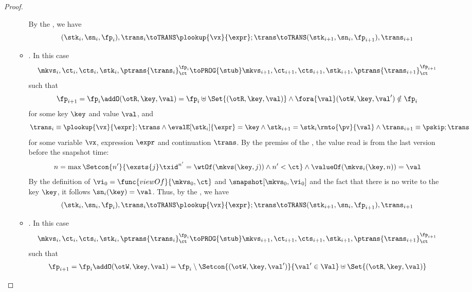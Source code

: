 \begin{proof}
\begin{itemize}
\begin{itemize}
                By the , we have 
                \[
                    (\stk_i, \sn_i, \fp_i), \trans_i \toTRANS \plookup{\vx}{\expr} ; \trans 
                    \toTRANS (\stk_{i+1}, \sn_i, \fp_{i+1} ), \trans_{i+1}
                \]
            \item {}.
                In this case
                \[
                    \mkvs_i, \ct_i, \cts_i, \stk_i, \ptrans{\trans_i}_\ct^{\fp_i}
                    \toPROG{\stub}
                    \mkvs_{i+1}, \ct_{i+1}, \cts_{i+1}, \stk_{i+1}, \ptrans{\trans_{i+1}}_\ct^{\fp_{i+1}}
                \]
                such that
                \[
                    \fp_{i+1} = \fp_i \addO (\otR, \key, \val) = \fp_i \uplus \Set{(\otR, \key, \val)}
                    \land \fora{\val} (\otW,\key, \val') \notin \fp_i
                \]
                for some key \( \key \) and value \( \val \), and
                \[
                    \trans_{i} \equiv \plookup{\vx}{\expr} ; \trans 
                    \land \evalE[\stk_i]{\expr} = \key 
                    \land \stk_{i+1} = \stk_i\rmto{\pv}{\val}
                    \land  \trans_{i+1} \equiv \pskip ; \trans
                \]
                for some variable \( \vx \), expression \( \expr \) and continuation \( \trans \).
                By the premiss of the , the value read is from the last version before the snapshot time:
                \[
                    n = \max\Setcon{n'}{%
                        \exsts{j} \txid^{n'} = \wtOf(\mkvs(\key, j)) \land n' < \ct%
                    } 
                    \land \valueOf(\mkvs_i(\key,n) ) = \val
                \]                 
                By the definition of \( \vi_0 = \func{viewOf}{\mkvs_0,\ct} \) and \( \snapshot[\mkvs_0,\vi_0] \) and the fact that there is no write to the key \( \key \),
                it follows \( \sn_i(\key) = \val \).
                Thus, by the , we have 
                \[
                    (\stk_i, \sn_i, \fp_i), \trans_i \toTRANS \plookup{\vx}{\expr} ; \trans 
                    \toTRANS (\stk_{i+1}, \sn_i, \fp_{i+1} ), \trans_{i+1}
                \]
            \item {}.
                In this case
                \[
                    \mkvs_i, \ct_i, \cts_i, \stk_i, \ptrans{\trans_i}_\ct^{\fp_i}
                    \toPROG{\stub}
                    \mkvs_{i+1}, \ct_{i+1}, \cts_{i+1}, \stk_{i+1}, \ptrans{\trans_{i+1}}_\ct^{\fp_{i+1}}
                \]
                such that
                \[
                    \fp_{i+1} = \fp_i \addO (\otW, \key, \val) = \fp_i \setminus \Setcon{(\otW, \key, \val')}{\val' \in \Val} \uplus \Set{(\otR, \key, \val)}
\]
\end{itemize}
\end{itemize}
\end{proof}
